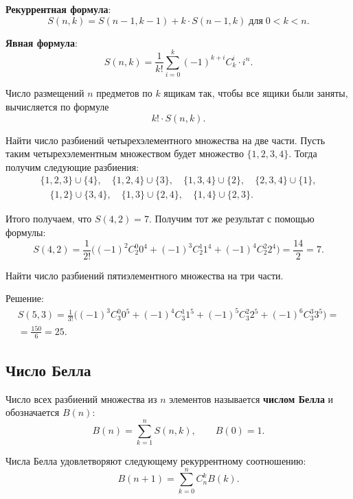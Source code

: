\textbf{Рекуррентная формула}:
\[
    S(n, k) = S(n - 1, k -1) + k \cdot S(n - 1, k) \; \text{для} \; 0 < k < n.
\]

\textbf{Явная формула}:
\[
    S(n, k) = \frac{1}{k!} \sum_{i = 0}^k (-1)^{k + i} C_k^i \cdot i^n.
\]

Число размещений \(n\) предметов по \(k\) ящикам так, чтобы все ящики были заняты, вычисляется по формуле
\[
    k! \cdot S(n, k).
\]

\begin{example}
    Найти число разбиений четырехэлементного множества на две части. Пусть таким четырехэлементным множеством будет множество \(\{1, 2, 3, 4\}\). Тогда получим следующие разбиения:
    \begin{gather*}
        \{1, 2, 3\} \cup \{4\},
        \quad
        \{1, 2, 4\} \cup \{3\},
        \quad
        \{1, 3, 4\} \cup \{2\},
        \quad
        \{2, 3, 4\} \cup \{1\}, \\
        \quad
        \{1, 2\} \cup \{3, 4\},
        \quad
        \{1, 3\} \cup \{2, 4\},
        \quad
        \{1, 4\} \cup \{2, 3\}.
    \end{gather*}

    Итого получаем, что \(S(4, 2) = 7\). Получим тот же результат с помощью формулы:
    \[
        S(4, 2) =
        \frac{1}{2!} \Big( (-1)^2 C_2^0 0^4 + (-1)^3 C_2^1 1^4 + (-1)^4 C_2^2 2^4 \Big) =
        \frac{14}{2} = 7.
    \]
\end{example}

\begin{example}
    Найти число разбиений пятиэлементного множества на три части.

    Решение:
    \begin{gather*}
        S(5, 3) = \frac{1}{3!} \Big( (-1)^3 C_3^0 0^5 + (-1)^4 C_3^1 1^5 + (-1)^5 C_3^2 2^5 + (-1)^6 C_3^3 3^5 \Big) = \\
        = \frac{150}{6} = 25.
    \end{gather*}
\end{example}

\subsection{Число Белла}

Число всех разбиений множества из \(n\) элементов называется \textbf{числом Белла} и обозначается \(B(n)\):
\[
    B(n) = \sum_{k = 1}^n S(n, k),
    \qquad
    B(0) = 1.
\]

\begin{theorem*}
    Числа Белла удовлетворяют следующему рекуррентному соотношению:
    \[
        B(n + 1) = \sum_{k = 0}^n C_n^k B(k).
    \]
\end{theorem*}

